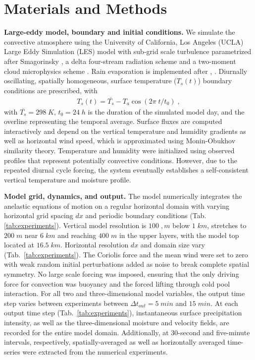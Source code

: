 \documentclass[draft,linenumbers]{agujournal2019}
\begin{document}
\section*{Materials and Methods}\label{sec:methods}
\noindent
{\bf Large-eddy model, boundary and initial conditions.}
We simulate the convective atmosphere using the University of California, Los Angeles (UCLA) Large Eddy Simulation (LES) model with sub-grid scale turbulence parametrized after Smagorinsky \cite{smagorinsky1963general}, a delta four-stream radiation scheme \cite{pincus2009monte} and a two-moment cloud microphysics scheme \cite{stevens2005evaluation}. 
Rain evaporation is implemented after \citeauthor{seifert2006two}, \citeyear{seifert2006two}.
Diurnally oscillating, spatially homogeneous, surface temperature ($T_s(t)$) boundary conditions are prescribed, with
\begin{eqnarray}
    T_s(t)=\overline{T_{s}}-T_{a} \cos{(2\pi\;t/t_0)}\;,
\end{eqnarray}
\noindent
with $\overline{T_{s}}=298\;K$, $t_0=24\;h$ is the duration of the simulated model day, and the overline representing the temporal average.
Surface fluxes are computed interactively and depend on the vertical temperature and humidity gradients as well as horizontal wind speed, which is approximated using Monin-Obukhov similarity theory.
Temperature and humidity were initialized using observed profiles that represent potentially convective conditions.
However, due to the repeated diurnal cycle forcing, the system eventually establishes a self-consistent vertical temperature and moisture profile.

\noindent
{\bf Model grid, dynamics, and output.}
The model numerically integrates the anelastic equations of motion on a regular horizontal domain with varying horizontal grid spacing $dx$ and periodic boundary conditions (Tab. \ref{tab:experiments}). 
Vertical model resolution is $100\;,m$ below $1\;km$, stretches to $200\;m$ near $6\;km$ and reaching $400\;m$ in the upper layers, with the model top located at $16.5\;km$.
Horizontal resolution $dx$ and domain size vary (Tab.~\ref{tab:experiments}). 
The Coriolis force and the mean wind were set to zero with weak random initial perturbations added as noise to break complete spatial symmetry. 
No large scale forcing was imposed, ensuring that the only driving force for convection was buoyancy and the forced lifting through cold pool interaction.
For all two and three-dimensional model variables, the output time step varies between experiments between $\Delta t_{out}=5\;min$ and $15\;min$. 
At each output time step (Tab.~\ref{tab:experiments}), instantaneous surface precipitation intensity, as well as the three-dimensional moisture and velocity fields, are recorded for the entire model domain. 
Additionally, at 30-second and five-minute intervals, respectively, spatially-averaged as well as horizontally averaged time-series were extracted from the numerical experiments.
\end{document}
